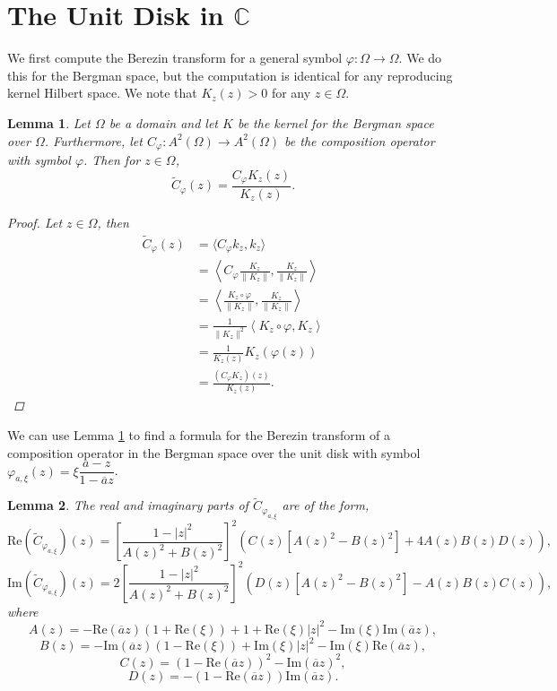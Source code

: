 \documentclass{amsart}
\newtheorem{lemma}{Lemma}
\theoremstyle{remark}
\begin{document}
\section{\texorpdfstring{The Unit Disk in $\mathbb{C}$}{The Unit Disk in ℂ}}
We first compute the Berezin transform for a general symbol $\varphi:\Omega \to \Omega$. We do this for the Bergman space, but the computation is identical for any reproducing kernel Hilbert space.  We note that $K_z(z)>0$ for any $z\in \Omega$.
\begin{lemma} \label{BerezinRangeComposition}
Let $\Omega$ be a domain and let $K$ be the kernel for the Bergman space over $\Omega$. Furthermore, let $C_{\varphi}:A^2(\Omega) \rightarrow A^2(\Omega)$ be the composition operator with symbol $\varphi$.
Then for $z \in \Omega$,
\begin{equation*}
    \widetilde{C}_{\varphi}(z) = \frac{C_{\varphi}K_{z}(z)}{K_{z}(z)}.
\end{equation*}
\begin{proof}
Let $z \in \Omega$, then  
\begin{align*}
    \widetilde{C}_{\varphi}(z) &= \langle C_{\varphi}k_z, k_{z} \rangle \\
                        &= \left\langle C_{\varphi}\frac{K_{z}}{\|K_{z}\|}, \frac{K_{z}}{\|K_{z}\|} \right\rangle \\
                        &= \left\langle \frac{K_{z} \circ \varphi}{\|K_{z}\|}, \frac{K_{z}}{\|K_{z}\|} \right\rangle \\
                        &= \frac{1}{\|K_{z}\|^{2}}\left\langle K_{z} \circ \varphi, K_{z} \right\rangle \\
                        &= \frac{1}{K_{z}(z)} K_{z}(\varphi(z)) \\
                        &= \frac{(C_{\varphi}K_{z})(z)}{K_{z}(z)}.
\end{align*}
\end{proof}
\end{lemma}
\noindent
We can use Lemma \ref{BerezinRangeComposition} to find a formula for the Berezin transform of a composition operator in the Bergman space over the unit disk with symbol $\varphi_{a,\xi}(z)=\xi\dfrac{a-z}{1-\overline{a}z}$.
\begin{lemma}\label{ReImBerezinTransform}
The real and imaginary parts of $\widetilde{C}_{\varphi_{a,\xi}}$ are of the form,
\[\mathrm{Re}(\widetilde{C}_{\varphi_{a,\xi}})(z)=\left[\dfrac{1-|z|^2}{A(z)^2+B(z)^2}\right]^2\left(C(z)[A(z)^2-B(z)^2]+4A(z)B(z)D(z)\right),\]
\[\mathrm{Im}(\widetilde{C}_{\varphi_{a,\xi}})(z)=2 \left[\dfrac{1-|z|^2}{A(z)^2+B(z)^2}\right]^2(D(z)[A(z)^2-B(z)^2]-A(z)B(z)C(z)),\]
where
\[A(z)= -\mathrm{Re}(\overline{a}z)(1+\mathrm{Re}(\xi))+ 1 + \mathrm{Re}(\xi)|z|^2-\mathrm{Im}(\xi)\mathrm{Im}(\overline{a}z),\]
\[B(z)=-\mathrm{Im}(\overline{a}z)(1-\mathrm{Re}(\xi))+\mathrm{Im}(\xi)|z|^2-\mathrm{Im}(\xi)\mathrm{Re}(\overline{a}z),\]
\[C(z)=(1-\mathrm{Re}(\overline{a}z))^2-\mathrm{Im}(\overline{a}z)^2,\]
\[D(z)=-(1-\mathrm{Re}(\overline{a}z))\mathrm{Im}(\overline{a}z).\]
\end{lemma}    
\end{document}
